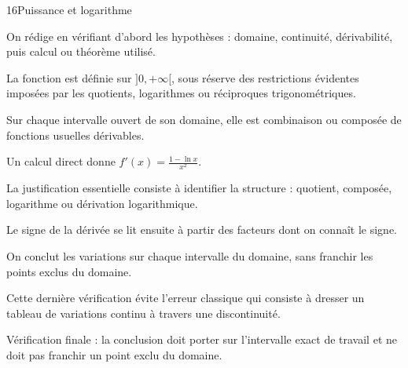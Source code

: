 \documentclass[11pt,a4paper]{article}
\begin{document}
\begin{corrbox}{16}{Puissance et logarithme}

\begin{methodebox}
On rédige en vérifiant d'abord les hypothèses : domaine, continuité, dérivabilité, puis calcul ou théorème utilisé.
\end{methodebox}

La fonction est définie sur $]0,+\infty[$, sous réserve des restrictions évidentes imposées par les quotients, logarithmes ou réciproques trigonométriques.


Sur chaque intervalle ouvert de son domaine, elle est combinaison ou composée de fonctions usuelles dérivables.


Un calcul direct donne $f'(x)=\frac{1-\ln x}{x^2}$.


La justification essentielle consiste à identifier la structure : quotient, composée, logarithme ou dérivation logarithmique.


Le signe de la dérivée se lit ensuite à partir des facteurs dont on connaît le signe.


On conclut les variations sur chaque intervalle du domaine, sans franchir les points exclus du domaine.


Cette dernière vérification évite l'erreur classique qui consiste à dresser un tableau de variations continu à travers une discontinuité.


\begin{attentionbox}
Vérification finale : la conclusion doit porter sur l'intervalle exact de travail et ne doit pas franchir un point exclu du domaine.
\end{attentionbox}

\end{corrbox}
\end{document}
